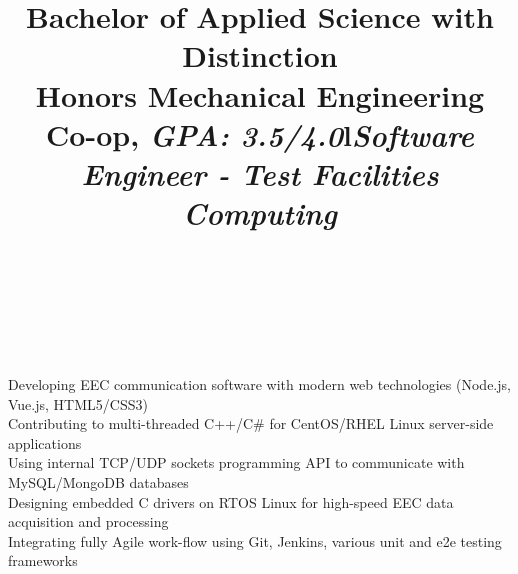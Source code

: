 \documentclass[mm]{res}
\begin{document}
\begin{resume}
\title{Bachelor of Applied Science with Distinction\\
Honors Mechanical Engineering Co-op, \textsl{GPA: 3.5/4.0}}
\begin{position}
\end{position}

\toprule

\section{\headingexperience}
\begin{format}
\\
\title{l}\\
\body\\
\end{format}

\title{\textsl{Software Engineer - Test Facilities Computing}}
\begin{position}
\tb Developing EEC communication software with modern web technologies (Node.js, Vue.js, HTML5/CSS3)\\
\tb Contributing to multi-threaded C++/C\# for CentOS/RHEL Linux server-side applications\\
\tb Using internal TCP/UDP sockets programming API to communicate with MySQL/MongoDB databases\\
\tb Designing embedded C drivers on RTOS Linux for high-speed EEC data acquisition and processing \\
\tb Integrating fully Agile work-flow using Git, Jenkins, various unit and e2e testing frameworks
\end{position}


\end{resume}
\end{document}
